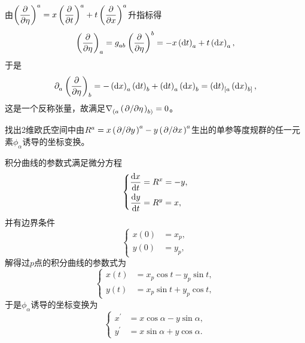 \begin{xiti}
	\begin{zm}
		由$\displaystyle \tensor{\left(\pdv{\eta}\right)}{^a} = x \tensor{\left(\pdv{t}\right)}{^a} + t\tensor{\left(\pdv{x}\right)}{^a} $升指标得
		\begin{displaymath}
		\tensor{\left(\pdv{\eta}\right)}{_a}= \tensor{g}{_a_b} \tensor{\left(\pdv{\eta}\right)}{^b} = - x \tensor{\left(\dd{t}\right)}{_a} + t \tensor{\left(\dd{x}\right)}{_a},
		\end{displaymath}
		于是
		\begin{displaymath}
		\Partial{a}\tensor{\left(\pdv{\eta}\right)}{_b}= - \tensor{\left(\dd{x}\right)}{_a} \tensor{\left(\dd{t}\right)}{_b} + \tensor{\left(\dd{t}\right)}{_a} \tensor{\left(\dd{x}\right)}{_b}=\tensor{\left(\dd{t}\right)}{_{[a}} \tensor{\left(\dd{x}\right)}{_{b]}},
		\end{displaymath}
		这是一个反称张量，故满足$\displaystyle \Nabla{(a} \tensor{\left(\pd{\eta}\right)}{_{b)}}=0 $。
	\end{zm}
	
	\item 找出2维欧氏空间中由$\tensor{R}{^a} = x \tensor{\left(\pd{y}\right)}{^a} - y \tensor{\left(\pd{x}\right)}{^a} $生出的单参等度规群的任一元素$\phi_\alpha$诱导的坐标变换。
	
	\begin{zm}
		积分曲线的参数式满足微分方程
		\begin{displaymath}
		\left\{
		\begin{aligned}
		\dv{x}{t} &= \tensor{R}{^x} = -y,\\
		\dv{y}{t} &= \tensor{R}{^y} = x ,
		\end{aligned}
		\right.
		\end{displaymath}
		并有边界条件
		\begin{displaymath}
		\left\{
		\begin{aligned}
		x(0) &= x_p,\\
		y(0) &= y_p ,
		\end{aligned}
		\right.
		\end{displaymath}
		解得过$p$点的积分曲线的参数式为
		\begin{displaymath}
		\left\{
		\begin{aligned}
		x(t) &= x_p \cos t - y_p \sin t ,\\
		y(t) &= x_p \sin t + y_p \cos t ,
		\end{aligned}
		\right.
		\end{displaymath}
		于是$\phi_\alpha$诱导的坐标变换为
		\begin{displaymath}
		\left\{
		\begin{aligned}
		x^\prime &= x \cos \alpha - y \sin \alpha ,\\
		y^\prime &= x \sin \alpha + y \cos \alpha .
		\end{aligned}
		\right.
		\end{displaymath}
	\end{zm}
	

\end{xiti}
